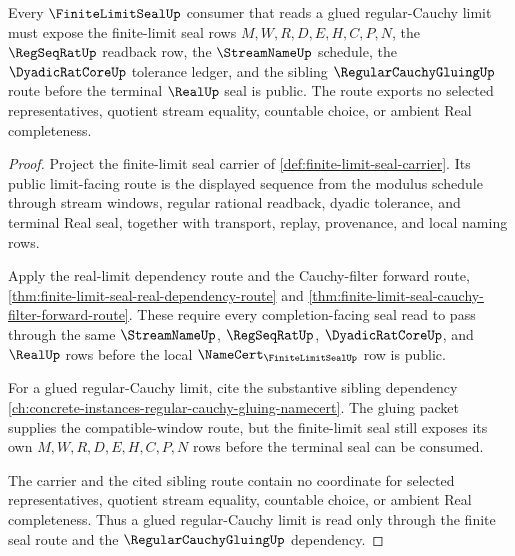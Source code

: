 \begin{theorem}
\label{thm:finite-limit-seal-regular-cauchy-gluing-route}
Every $\FiniteLimitSealUp$ consumer that reads a glued regular-Cauchy limit must expose the finite-limit seal rows $M,W,R,D,E,H,C,P,N$, the $\RegSeqRatUp$ readback row, the $\StreamNameUp$ schedule, the $\DyadicRatCoreUp$ tolerance ledger, and the sibling $\RegularCauchyGluingUp$ route before the terminal $\RealUp$ seal is public. The route exports no selected representatives, quotient stream equality, countable choice, or ambient Real completeness.
\end{theorem}
\begin{proof}
Project the finite-limit seal carrier of \autoref{def:finite-limit-seal-carrier}. Its public limit-facing route is the displayed sequence from the modulus schedule through stream windows, regular rational readback, dyadic tolerance, and terminal Real seal, together with transport, replay, provenance, and local naming rows.

Apply the real-limit dependency route and the Cauchy-filter forward route, \autoref{thm:finite-limit-seal-real-dependency-route} and \autoref{thm:finite-limit-seal-cauchy-filter-forward-route}. These require every completion-facing seal read to pass through the same $\StreamNameUp$, $\RegSeqRatUp$, $\DyadicRatCoreUp$, and $\RealUp$ rows before the local $\NameCert_{\FiniteLimitSealUp}$ row is public.

For a glued regular-Cauchy limit, cite the substantive sibling dependency \autoref{ch:concrete-instances-regular-cauchy-gluing-namecert}. The gluing packet supplies the compatible-window route, but the finite-limit seal still exposes its own $M,W,R,D,E,H,C,P,N$ rows before the terminal seal can be consumed.

The carrier and the cited sibling route contain no coordinate for selected representatives, quotient stream equality, countable choice, or ambient Real completeness. Thus a glued regular-Cauchy limit is read only through the finite seal route and the $\RegularCauchyGluingUp$ dependency.
\end{proof}
